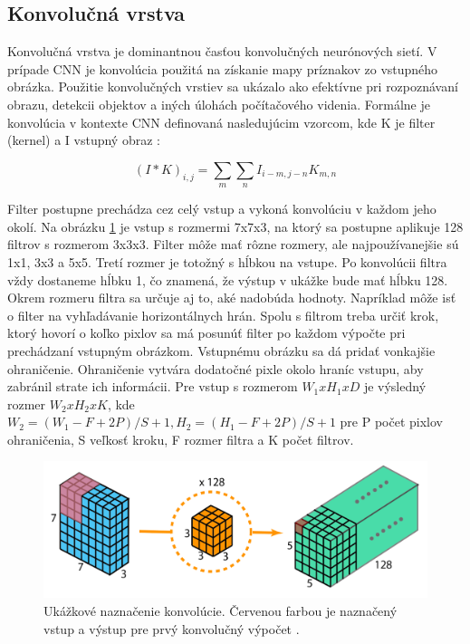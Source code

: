 \subsection{Konvolučná vrstva}

Konvolučná vrstva je dominantnou časťou konvolučných neurónových sietí. V prípade CNN je konvolúcia použitá na získanie mapy príznakov zo vstupného obrázka. Použitie konvolučných vrstiev sa ukázalo ako efektívne pri rozpoznávaní obrazu, detekcii objektov a iných úlohách počítačového videnia. Formálne je konvolúcia v kontexte CNN definovaná nasledujúcim vzorcom, kde K je filter (kernel) a I vstupný obraz \cite{cnn-intro}:

\begingroup
\large
\begin{equation}
(I*K)_{i,j} = \sum_{m} \sum_{n} I_{i-m, j-n} K_{m,n}
\end{equation}
\endgroup

Filter postupne prechádza cez celý vstup a vykoná konvolúciu v každom jeho okolí. Na obrázku \ref{img:conv} je vstup s rozmermi 7x7x3, na ktorý sa postupne aplikuje 128 filtrov s rozmerom 3x3x3. Filter môže mať rôzne rozmery, ale najpoužívanejšie sú 1x1, 3x3 a 5x5. Tretí rozmer je totožný s hĺbkou na vstupe. Po konvolúcii filtra vždy dostaneme hĺbku 1, čo znamená, že výstup v ukážke bude mať hĺbku 128. Okrem rozmeru filtra sa určuje aj to, aké nadobúda hodnoty. Napríklad môže isť o filter na vyhľadávanie horizontálnych hrán. Spolu s filtrom treba určiť krok, ktorý hovorí o koľko pixlov sa má posunúť filter po každom výpočte pri prechádzaní vstupným obrázkom. Vstupnému obrázku sa dá pridať vonkajšie ohraničenie. Ohraničenie vytvára dodatočné pixle okolo hraníc vstupu, aby zabránil strate ich informácii. Pre vstup s rozmerom \begin{math}W_1xH_1xD\end{math} je výsledný rozmer \begin{math}W_2xH_2xK\end{math}, kde \begin{math}W_2 = (W_1 - F + 2P)/S + 1, H_2 = (H_1 - F + 2P)/S + 1\end{math} pre P počet pixlov ohraničenia, S veľkosť kroku, F rozmer filtra a K počet filtrov.

\begin{figure}[ht]
    \centering
    \includegraphics[width=.7\textwidth]{images/02/filters2.png}
    \caption{Ukážkové naznačenie konvolúcie. Červenou farbou je naznačený vstup a výstup pre prvý konvolučný výpočet \cite{filters}. }
    \label{img:conv}
\end{figure}

